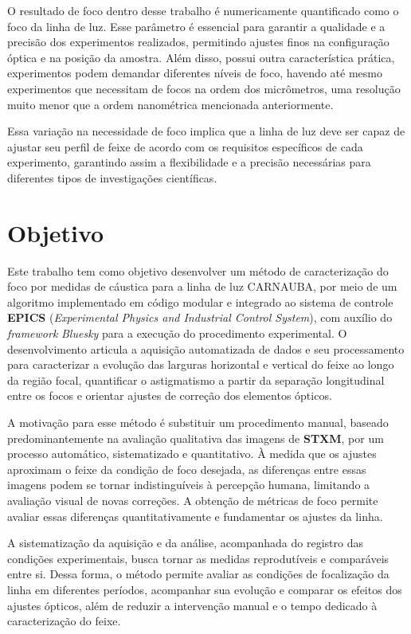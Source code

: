 \documentclass[12pt,a4paper]{article}
\makeatletter
\newcommand{\CNB}{CARNAUBA}
\newcommand{\rotulosecao}[2]{%
    \phantomsection
    \def\@currentlabelname{#2}%
    \label{#1}%
}
\makeatother
\begin{document}
O resultado de foco dentro desse trabalho é numericamente quantificado como o foco da linha de luz. Esse parâmetro é essencial para garantir a qualidade e a precisão dos experimentos realizados, permitindo ajustes finos na configuração óptica e na posição da amostra.
Além disso, possui outra característica prática, experimentos podem demandar diferentes níveis de foco, havendo até mesmo experimentos que necessitam de focos na ordem dos micrômetros, uma resolução muito menor que a ordem nanométrica mencionada anteriormente.

Essa variação na necessidade de foco implica que a linha de luz deve ser capaz de ajustar seu perfil de feixe de acordo com os requisitos específicos de cada experimento, garantindo assim a flexibilidade e a precisão necessárias para diferentes tipos de investigações científicas.



\newpage
{}
\section*{Objetivo}
\rotulosecao{sec:objetivo}{Objetivo}

Este trabalho tem como objetivo desenvolver um método de caracterização do foco por medidas de cáustica para a linha de luz \CNB, por meio de um algoritmo implementado em código modular e integrado ao sistema de controle \textbf{EPICS} (\textit{Experimental Physics and Industrial Control System}), com auxílio do \textit{framework} \textit{Bluesky} para a execução do procedimento experimental. O desenvolvimento articula a aquisição automatizada de dados e seu processamento para caracterizar a evolução das larguras horizontal e vertical do feixe ao longo da região focal, quantificar o astigmatismo a partir da separação longitudinal entre os focos e orientar ajustes de correção dos elementos ópticos.

A motivação para esse método é substituir um procedimento manual, baseado predominantemente na avaliação qualitativa das imagens de \textbf{STXM}, por um processo automático, sistematizado e quantitativo. À medida que os ajustes aproximam o feixe da condição de foco desejada, as diferenças entre essas imagens podem se tornar indistinguíveis à percepção humana, limitando a avaliação visual de novas correções. A obtenção de métricas de foco permite avaliar essas diferenças quantitativamente e fundamentar os ajustes da linha.

A sistematização da aquisição e da análise, acompanhada do registro das condições experimentais, busca tornar as medidas reprodutíveis e comparáveis entre si. Dessa forma, o método permite avaliar as condições de focalização da linha em diferentes períodos, acompanhar sua evolução e comparar os efeitos dos ajustes ópticos, além de reduzir a intervenção manual e o tempo dedicado à caracterização do feixe.
\end{document}
